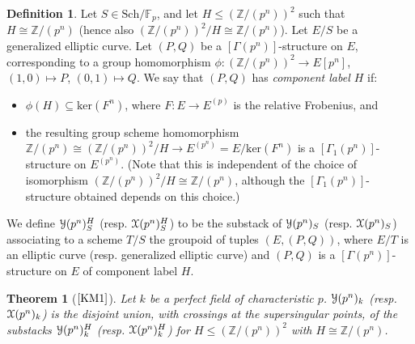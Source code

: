 \documentclass[11pt]{amsart}
\newtheorem{theorem}[subsection]{Theorem}
\theoremstyle{definition}
\newtheorem{definition}[subsection]{Definition}
\begin{document}
\begin{definition}
Let $S \in \mathrm{Sch}/\mathbb{F}_p$, and let $H \leq (\mathbb{Z}/(p^n))^2$ such that $H \cong \mathbb{Z}/(p^n)$ (hence also $(\mathbb{Z}/(p^n))^2/H \cong \mathbb{Z}/(p^n)$). Let $E/S$ be a generalized elliptic curve. Let $(P,Q)$ be a $[\Gamma(p^n)]$-structure on $E$, corresponding to a group homomorphism $\phi:(\mathbb{Z}/(p^n))^2 \rightarrow E[p^n]$, $(1,0) \mapsto P$, $(0,1) \mapsto Q$. We say that $(P,Q)$ has \textit{component label $H$} if:
\begin{itemize}
  \item $\phi(H) \subseteq \mathrm{ker}(F^n)$, where $F:E \rightarrow E^{(p)}$ is the relative Frobenius, and 
  \item the resulting group scheme homomorphism $\mathbb{Z}/(p^n) \cong (\mathbb{Z}/(p^n))^2/H \rightarrow E^{(p^n)} = E/\mathrm{ker}(F^n)$ is a $[\Gamma_1(p^n)]$-structure on $E^{(p^n)}$. (Note that this is independent of the choice of isomorphism $(\mathbb{Z}/(p^n))^2/H \cong \mathbb{Z}/(p^n)$, although the $[\Gamma_1(p^n)]$-structure obtained depends on this choice.)
\end{itemize}

We define ${\mathbf{\EuScript{Y}}}(p^n)^H_S$ (resp. ${\mathbf{\EuScript{X}}}(p^n)^H_S$) to be the substack of ${\mathbf{\EuScript{Y}}}(p^n)_S$ (resp. ${\mathbf{\EuScript{X}}}(p^n)_S$) associating to a scheme $T/S$ the groupoid of tuples $(E,(P,Q))$, where $E/T$ is an elliptic curve (resp. generalized elliptic curve) and $(P,Q)$ is a $[\Gamma(p^n)]$-structure on $E$ of component label $H$.
\end{definition}

\begin{theorem}[$\textrm{\cite[13.7.6]{KM1}}$]
Let $k$ be a perfect field of characteristic $p$. ${\mathbf{\EuScript{Y}}}(p^n)_k$ (resp. ${\mathbf{\EuScript{X}}}(p^n)_k$) is the disjoint union, with crossings at the supersingular points, of the substacks ${\mathbf{\EuScript{Y}}}(p^n)^H_k$ (resp. ${\mathbf{\EuScript{X}}}(p^n)^H_k$) for $H \leq (\mathbb{Z}/(p^n))^2$ with $H \cong \mathbb{Z}/(p^n)$.
\end{theorem}
\end{document}
